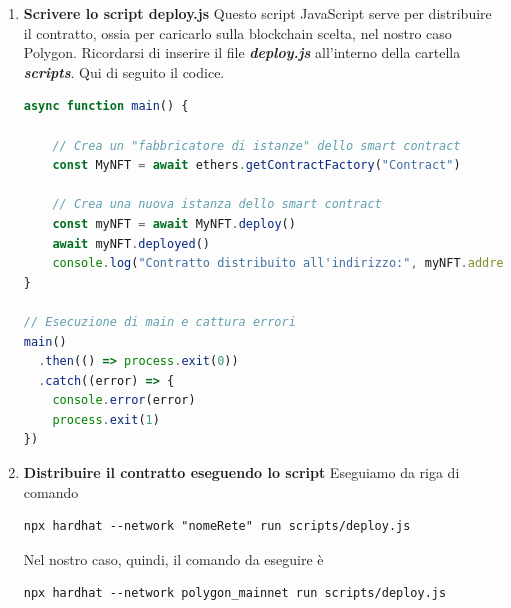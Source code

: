 \documentclass[12pt]{report}
\begin{document}
\begin{enumerate}[topsep=5pt, itemsep=0pt]
\item \textbf{Scrivere lo script deploy.js}\newline
Questo script JavaScript serve per distribuire il contratto, ossia per caricarlo sulla blockchain scelta, nel nostro caso Polygon.\newline
Ricordarsi di inserire il file \textit{\textbf{deploy.js}} all'interno della cartella \textit{\textbf{scripts}}.\newline
Qui di seguito il codice.
\begin{lstlisting}[language=JavaScript, aboveskip=2pt]
async function main() {

    // Crea un "fabbricatore di istanze" dello smart contract
    const MyNFT = await ethers.getContractFactory("Contract")
  
    // Crea una nuova istanza dello smart contract
    const myNFT = await MyNFT.deploy()
    await myNFT.deployed()
    console.log("Contratto distribuito all'indirizzo:", myNFT.address)
}
  
// Esecuzione di main e cattura errori
main()
  .then(() => process.exit(0))
  .catch((error) => {
    console.error(error)
    process.exit(1)
})
\end{lstlisting}

\item \textbf{Distribuire il contratto eseguendo lo script}\newline
Eseguiamo da riga di comando
\begin{lstlisting}[language=HTML, numbers=none, aboveskip=2pt, belowskip=-3pt]
npx hardhat --network "nomeRete" run scripts/deploy.js
\end{lstlisting}
Nel nostro caso, quindi, il comando da eseguire è
\begin{lstlisting}[language=HTML, numbers=none, aboveskip=2pt, belowskip=-3pt]
npx hardhat --network polygon_mainnet run scripts/deploy.js
\end{lstlisting}

\end{enumerate}\newpage
\end{document}
